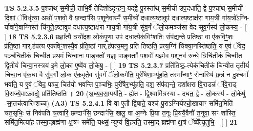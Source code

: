 \documentclass[17pt]{extarticle}
\begin{document}
                                \textbf{ TS 5.2.3.5} \newline
                  प॒श्चाथ् स॒मीची॒ ताभि॒र्वै तेदिशो॑ऽदृꣳह॒न्॒ यद्द्वे पु॒रस्ता᳚थ् स॒मीची॑ उप॒दधा॑ति॒ द्वे प॒॒श्चाथ् स॒मीची॑ दि॒शां ॅविधृ॑त्या॒ अथो॑ प॒शवो॒ वै छन्दाꣳ॑सि प॒शूने॒वास्मै॑ स॒मीचो॑ दधात्य॒ष्टावुप॑ दधात्य॒ष्टाक्ष॑रा गाय॒त्री गा॑य॒त्रो᳚ऽग्नि-र्यावा॑ने॒वाग्निस्तं चि॑नुते॒ऽष्टावुप॑ दधात्य॒ष्टाक्ष॑रा गाय॒त्री गा॑य॒त्री सु॑व॒र्गं ॅलो॒कमञ्ज॑सा वेद सुव॒र्गस्य॑ लो॒कस्य॒ - [  ] \textbf{  18} \newline
                  \newline
                                \textbf{ TS 5.2.3.6} \newline
                  प्रज्ञा᳚त्यै॒ त्रयो॑दश लोकंपृ॒णा उप॑ दधा॒त्येक॑विꣳशतिः॒ संप॑द्यन्ते प्रति॒ष्ठा वा ए॑कविꣳ॒॒शः प्र॑ति॒ष्ठा गार्.ह॑पत्य एकविꣳ॒॒शस्यै॒व प्र॑ति॒ष्ठां गार्.ह॑पत्य॒मनु॒ प्रति॑ तिष्ठति॒ प्रत्य॒ग्निं चि॑क्या॒नस्ति॑ष्ठति॒ य ए॒वं ॅवेद॒ पञ्च॑चितीकं चिन्वीत प्रथ॒मं चि॑न्वा॒नः पाङ्क्तो॑ य॒ज्ञ्ः पाङ्क्ताः᳚ प॒शवो॑ य॒ज्ञ्मे॒व प॒शूनव॑ रुन्धे॒ त्रिचि॑तीकं चिन्वीत द्वि॒तीयं॑ चिन्वा॒नस्त्रय॑ इ॒मे लो॒का ए॒ष्वे॑व लो॒केषु॒ - [  ] \textbf{  19} \newline
                  \newline
                                \textbf{ TS 5.2.3.7} \newline
                  प्रति॑तिष्ठ॒-त्येक॑चितीकं चिन्वीत तृ॒तीयं॑ चिन्वा॒न ए॑क॒धा वै सु॑व॒र्गो लो॒क ए॑क॒वृतै॒व सु॑वर्गं ॅलो॒कमे॑ति॒ पुरी॑षेणा॒भ्यू॑हति॒ तस्मा᳚न्माꣳ॒॒ सेनास्थि॑ छ॒न्नं न दु॒श्चर्मा॑ भवति॒ य ए॒वं ॅवेद॒ पञ्च॒ चित॑यो भवन्ति प॒ञ्चभिः॒ पुरी॑षैर॒भ्यू॑हति॒ दश॒ संप॑द्यन्ते॒ दशा᳚क्षरा वि॒राडन्नं॑ ॅवि॒राड् वि॒राज्ये॒वाऽन्नाद्ये॒ प्रति॑तिष्ठति ॥ \textbf{  20 } \newline
                  \newline
                      (अ॒ध्य॒व॒सा॒यय॑ति॒ - ह्ये॑त - द्वि॒श्वामि॑त्रस्या - दधत॒ द्वे - लो॒कस्य॑ - लो॒केषु॑ -स॒प्तच॑त्वारिꣳशच्च)  \textbf{(A3)} \newline \newline
                                        \textbf{ TS 5.2.4.1} \newline
                  वि वा ए॒तौ द्वि॑षाते॒ यश्च॑ पु॒राऽग्निर्यश्चो॒खायाꣳ॒॒ समि॑त॒मिति॑ चत॒सृभिः॒ सं निव॑पति च॒त्वारि॒ छन्दाꣳ॑सि॒ छन्दाꣳ॑सि॒ खलु॒ वा अ॒ग्नेः प्रि॒या त॒नूः प्रि॒ययै॒वैनौ॑ त॒नुवा॒ सꣳ शा᳚स्ति॒ समि॑त॒मित्या॑ह॒ तस्मा॒द्ब्रह्म॑णा क्ष॒त्रꣳ समे॑ति॒ यथ्सं॒ न्युप्य॑ वि॒हर॑ति॒ तस्मा॒द् ब्रह्म॑णा क्ष॒त्रं ॅव्ये᳚त्यृ॒तुभि॒ - [  ] \textbf{  21} \newline
                  \newline
\end{document}
